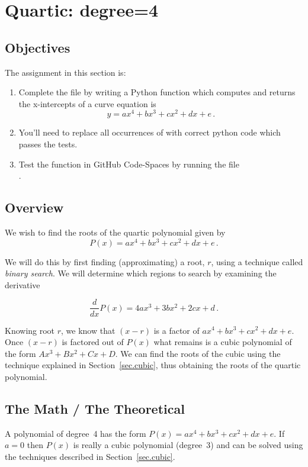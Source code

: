 \section{Quartic: degree=4}
\label{sec.quartic}

\subsection{Objectives}
The assignment in this section is:
\begin{enumerate}
\item Complete the file  by writing a Python
  function which computes and returns the x-intercepts of a curve
  equation is \[y=a x^4 + b x^3 + c x^2 + d x + e\,.\]
\item You'll need to replace all occurrences of 
  with correct python code which passes the tests.
\item Test the function in GitHub Code-Spaces by running the file\\
  .
\end{enumerate}

\subsection{Overview}

We wish to find the roots of the quartic polynomial given by 
\[P(x) = ax^4 + b x^3 + c x^2 + d x + e\,.\]

We will do this by first finding
(approximating) a root, $r$, using a technique called \emph{binary
search}.  We will determine which regions to search by examining the derivative

\[\frac{d}{d x} P(x) = 4ax^3 + 3b x^2 + 2c x + d\,.\]

Knowing root $r$, we know that $(x-r)$ is a factor of 
$a x^4 + b x^3 + c x^2 + d x + e$.  Once $(x-r)$ is factored out of $P(x)$
what remains is a cubic polynomial of the form $A x^3 + B x^2 + C x + D$.
We can find the roots of the cubic using the technique
explained in Section~\ref{sec.cubic}, thus obtaining the roots of
the quartic polynomial.


\subsection{The Math / The Theoretical}


A polynomial of degree~4 has the form $P(x) = a x^4 + b x^3 + c x^2 +
d x + e$. If $a=0$ then $P(x)$ is really a cubic polynomial (degree~3)
and can be solved using the techniques described in
Section~\ref{sec.cubic}.

